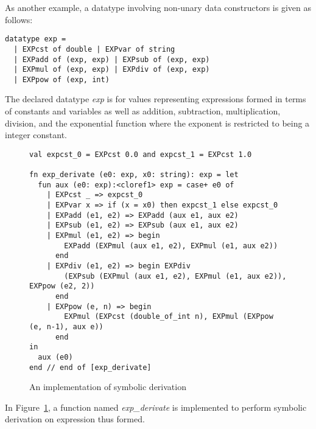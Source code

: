 As another example, a datatype involving non-unary data constructors is
given as follows:
\begin{verbatim}
datatype exp =
  | EXPcst of double | EXPvar of string
  | EXPadd of (exp, exp) | EXPsub of (exp, exp)
  | EXPmul of (exp, exp) | EXPdiv of (exp, exp)
  | EXPpow of (exp, int)
\end{verbatim}
The declared datatype {\it exp} is for values representing expressions
formed in terms of constants and variables as well as addition,
subtraction, multiplication, division, and the exponential function where
the exponent is restricted to being a integer constant.
\begin{figure}[thp]
\begin{verbatim}
val expcst_0 = EXPcst 0.0 and expcst_1 = EXPcst 1.0

fn exp_derivate (e0: exp, x0: string): exp = let
  fun aux (e0: exp):<cloref1> exp = case+ e0 of
    | EXPcst _ => expcst_0
    | EXPvar x => if (x = x0) then expcst_1 else expcst_0
    | EXPadd (e1, e2) => EXPadd (aux e1, aux e2)
    | EXPsub (e1, e2) => EXPsub (aux e1, aux e2)
    | EXPmul (e1, e2) => begin
        EXPadd (EXPmul (aux e1, e2), EXPmul (e1, aux e2))
      end
    | EXPdiv (e1, e2) => begin EXPdiv
        (EXPsub (EXPmul (aux e1, e2), EXPmul (e1, aux e2)), EXPpow (e2, 2))
      end
    | EXPpow (e, n) => begin
        EXPmul (EXPcst (double_of_int n), EXPmul (EXPpow (e, n-1), aux e))
      end
in
  aux (e0)
end // end of [exp_derivate]
\end{verbatim}
\caption{An implementation of symbolic derivation}
\label{figure:symbolic_derivation}
\end{figure}
In Figure~\ref{figure:symbolic_derivation}, a function named
{\it exp\_derivate} is implemented to perform symbolic derivation
on expression thus formed.

